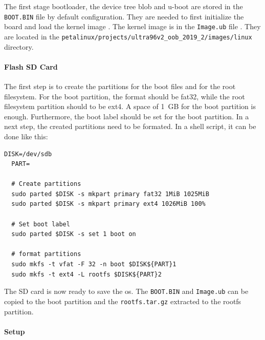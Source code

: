 The first stage bootloader, the device tree blob and u-boot are stored in the \texttt{BOOT.BIN} file by default configuration.
They are needed to first initialize the board and load the kernel image \cite{xilinx_wiki_boot}.
The kernel image is in the \texttt{Image.ub} file \cite{xilinx_wiki_uboot}.
They are located in the \texttt{petalinux/projects/ultra96v2\_oob\_2019\_2/images/linux} directory.

\paragraph{Flash SD Card}
The first step is to create the partitions for the boot files and for the root filesystem.
For the boot partition, the format should be fat32, while the root filesystem partition should to be ext4.
A space of \SI{1}{GB} for the boot partition is enough.
Furthermore, the boot label should be set for the boot partition.
In a next step, the created partitions need to be formated.
In a shell script, it can be done like this:

\begin{lstlisting}[style=bash, caption={Prepair SD card}, label=lst:create_partitions]
  DISK=/dev/sdb
  PART=

  # Create partitions
  sudo parted $DISK -s mkpart primary fat32 1MiB 1025MiB
  sudo parted $DISK -s mkpart primary ext4 1026MiB 100%

  # Set boot label
  sudo parted $DISK -s set 1 boot on

  # format partitions
  sudo mkfs -t vfat -F 32 -n boot $DISK${PART}1
  sudo mkfs -t ext4 -L rootfs $DISK${PART}2
\end{lstlisting}

The SD card is now ready to save the \acrshort{os}.
The \texttt{BOOT.BIN} and \texttt{Image.ub} can be copied to the boot partition and the \texttt{rootfs.tar.gz} extracted to the rootfs partition.

\paragraph{Setup}
